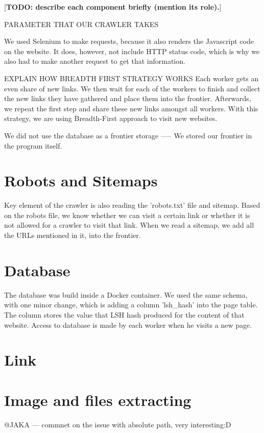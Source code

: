 \documentclass[9pt]{IEEEtran}
\begin{document}
[\textbf{TODO: describe each component briefly (mention its role).}]

PARAMETER THAT OUR CRAWLER TAKES

We used Selenium to make requests, because it also renders the Javascript code on the website. It does, however, not include HTTP status code, which is why we also had to make another request to get that information.


EXPLAIN HOW BREADTH FIRST STRATEGY WORKS
Each worker gets an even share of new links. We then wait for each of the workers to finish and collect the new links they have gathered and place them into the frontier. Afterwards, we repeat the first step and share these new links amongst all workers. With this strategy, we are using Breadth-First approach to visit new websites.


We did not use the database as a frontier storage ----- We stored our frontier in the program itself.

\section{Robots and Sitemaps}
Key element of the crawler is also reading the 'robots.txt' file and sitemap. Based on the robots file, we know whether we can visit a certain link or whether it is not allowed for a crawler to visit that link.
When we read a sitemap, we add all the URLs mentioned in it, into the frontier. 


\section{Database}
The database was build inside a Docker container. We used the same schema, with one minor change, which is adding a column 'lsh\_hash' into the page table. The column stores the value that LSH hash produced for the content of that website. Access to database is made by each worker when he visits a new page. 







\section{Link}


\section{Image and files extracting}
@JAKA --- commnet on the issue with absolute path, very interesting:D
\end{document}
